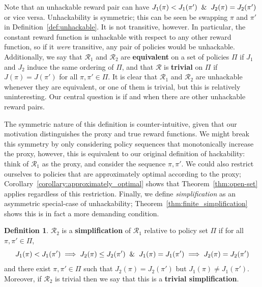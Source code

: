 \documentclass{article}
\theoremstyle{definition}
\newtheorem{definition}{Definition}
\theoremstyle{remark}
\begin{document}
Note that an unhackable reward pair can have $J_1(\pi) < J_1(\pi') \And J_2(\pi) = J_2(\pi')$ or vice versa.
Unhackability is symmetric; this can be seen be swapping $\pi$ and $\pi'$ in Definition~\ref{def:unhackable}.
It is not transitive, however. In particular, the constant reward function is unhackable with respect to any other reward function, so if it \textit{were} transitive, any pair of policies would be unhackable. 
Additionally, we say that $\mathcal{R}_1$ and $\mathcal{R}_2$ are \textbf{equivalent} on a set of policies $\Pi$ if $J_1$ and $J_2$ induce the same ordering of $\Pi$, and that $\mathcal{R}$ is \textbf{trivial} on $\Pi$ if $J(\pi) = J(\pi')$ for all $\pi,\pi' \in \Pi$. It is clear that $\mathcal{R}_1$ and $\mathcal{R}_2$ are unhackable whenever they are equivalent, or one of them is trivial, but this is relatively uninteresting. Our central question is if and when there are other unhackable reward pairs. 

The symmetric nature of this definition is counter-intuitive, given that our motivation distinguishes the proxy and true reward functions.
We might break this symmetry by only considering policy sequences that monotonically increase the proxy, however, this is equivalent to our original definition of hackability: think of $\mathcal{R}_1$ as the proxy, and consider the sequence $\pi, \pi'$.
We could also restrict ourselves to policies that are approximately optimal according to the proxy; Corollary~\ref{corollary:approximately_optimal} shows that Theorem~\ref{thm:open-set} applies regardless of this restriction. %
Finally, we define \emph{simplification} as an asymmetric special-case of unhackability; Theorem~\ref{thm:finite_simplification} shows this is in fact a more demanding condition. %

\begin{definition}
$\mathcal{R}_2$ is a \textbf{simplification} of $\mathcal{R}_1$ relative to policy set $\Pi$ if for all $\pi,\pi' \in \Pi$, 
$$
J_1(\pi) < J_1(\pi') \implies J_2(\pi) \leq J_2(\pi') 
\And 
J_1(\pi) = J_1(\pi') \implies J_2(\pi) = J_2(\pi')
$$
and there exist $\pi,\pi' \in \Pi$ such that $J_2(\pi) = J_2(\pi')$ but $J_1(\pi) \neq J_1(\pi')$. Moreover, if $\mathcal{R}_2$ is trivial
then we say that this is a \textbf{trivial simplification}.
\end{definition}
\end{document}
